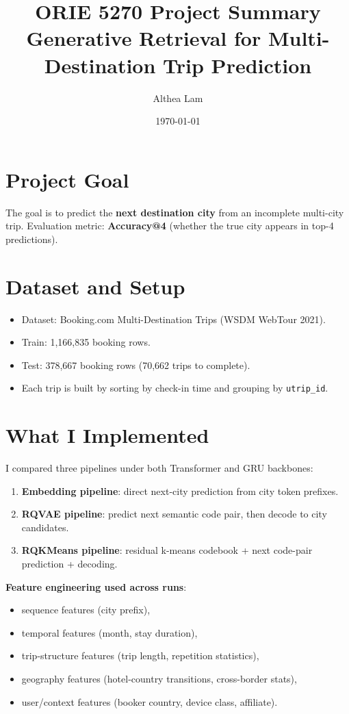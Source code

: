 \documentclass[11pt]{article}
\title{ORIE 5270 Project Summary\\Generative Retrieval for Multi-Destination Trip Prediction}
\author{Althea Lam}
\date{\today}
\begin{document}
\maketitle
\onehalfspacing

\section*{Project Goal}
The goal is to predict the \textbf{next destination city} from an incomplete multi-city trip.  
Evaluation metric: \textbf{Accuracy@4} (whether the true city appears in top-4 predictions).

\section*{Dataset and Setup}
\begin{itemize}[leftmargin=1.5em]
    \item Dataset: Booking.com Multi-Destination Trips (WSDM WebTour 2021).
    \item Train: 1,166,835 booking rows.
    \item Test: 378,667 booking rows (70,662 trips to complete).
    \item Each trip is built by sorting by check-in time and grouping by \texttt{utrip\_id}.
\end{itemize}

\section*{What I Implemented}
I compared three pipelines under both Transformer and GRU backbones:
\begin{enumerate}[leftmargin=1.5em]
    \item \textbf{Embedding pipeline}: direct next-city prediction from city token prefixes.
    \item \textbf{RQVAE pipeline}: predict next semantic code pair, then decode to city candidates.
    \item \textbf{RQKMeans pipeline}: residual k-means codebook + next code-pair prediction + decoding.
\end{enumerate}

\textbf{Feature engineering used across runs}:
\begin{itemize}[leftmargin=1.5em]
    \item sequence features (city prefix),
    \item temporal features (month, stay duration),
    \item trip-structure features (trip length, repetition statistics),
    \item geography features (hotel-country transitions, cross-border stats),
    \item user/context features (booker country, device class, affiliate).
\end{itemize}
\end{document}
